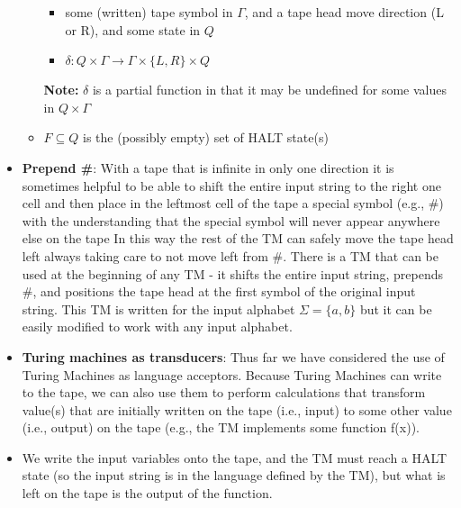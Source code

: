 \documentclass{report}
\begin{document}
\begin{itemize}
\begin{itemize}
\begin{itemize}
                        \item some (written) tape symbol in $\Gamma$, and a tape head move direction (L or R), and some state in $Q$
                        \item $\delta: Q \times \Gamma\to \Gamma \times \{L,R\} \times Q $
                    \end{itemize}
                    \bigbreak \noindent 
                    \textbf{Note:} $\delta$ is a partial function in that it may be undefined for some values in $Q \times \Gamma$
                \item $F \subseteq Q$ is the (possibly empty) set of HALT state(s)

            \end{itemize}
        \item \textbf{Prepend \#}: With a tape that is infinite in only one direction it is sometimes helpful to be able to shift the entire input string to the right one cell and then place in the leftmost cell of the tape a special symbol (e.g., \#) with the understanding that the special symbol will never appear anywhere else on the tape
            \bigbreak \noindent 
            In this way the rest of the TM can safely move the tape head left always taking care to not move left from \#.
            \bigbreak \noindent 
            There is a TM that can be used at the beginning of any TM - it shifts the entire input string, prepends \#, and positions the tape head at the first symbol of the original input string.
            \bigbreak \noindent 
            This TM is written for the input alphabet $\Sigma = \{a,b\}$ but it can be easily modified to work with any input alphabet.
            \bigbreak \noindent 
        \item \textbf{Turing machines as transducers}: 
            Thus far we have considered the use of Turing Machines as language acceptors.
            \bigbreak \noindent 
            Because Turing Machines can write to the tape, we can also use them to perform calculations that transform value(s) that are initially written on the tape (i.e., input) to some other value (i.e., output) on the tape (e.g., the TM implements some function f(x)).
            \bigbreak \noindent 
        \item We write the input variables onto the tape, and the TM must reach a HALT state (so the input string is in the language defined by the TM), but what is left on the tape is the output of the function.
            \bigbreak \noindent 

\end{itemize}
\end{document}
